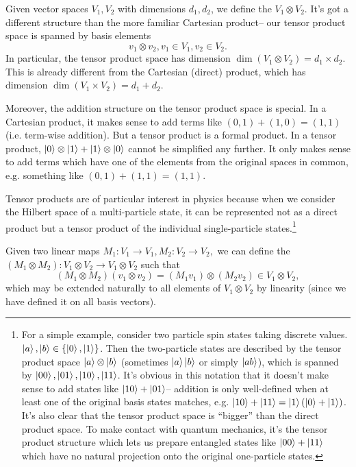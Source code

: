 \begin{defn}
Given vector spaces $V_1,V_2$ with dimensions $d_1,d_2$, we define the  $V_1 \otimes V_2$. It's got a different structure than the more familiar Cartesian product-- our tensor product space is spanned by basis elements
$$v_1 \otimes v_2, v_1\in V_1,v_2\in V_2.$$
In particular, the tensor product space has dimension $\dim(V_1\otimes V_2)=d_1 \times d_2$.
This is already different from the Cartesian (direct) product, which has dimension $\dim(V_1\times V_2)=d_1+d_2$. 

Moreover, the addition structure on the tensor product space is special. In a Cartesian product, it makes sense to add terms like $(0,1)+(1,0)=(1,1)$ (i.e. term-wise addition). But a tensor product is a formal product. In a tensor product, $\left| 0 \right>\otimes \left| 1 \right> + \left| 1 \right>\otimes \left| 0 \right>$ cannot be simplified any further. It only makes sense to add terms which have one of the elements from the original spaces in common, e.g. something like $(0,1)+(1,1)=(1,1).$ 

Tensor products are of particular interest in physics because when we consider the Hilbert space of a multi-particle state, it can be represented not as a direct product but a tensor product of the individual single-particle states.\footnote{For a simple example, consider two particle spin states taking discrete values. $\left| a \right>,\left| b \right>\in \{\left| 0 \right>,\left| 1 \right>\}$. Then the two-particle states are described by the tensor product space $\left| a \right>\otimes\left| b \right>$ (sometimes $\left| a \right>\left| b \right>$ or simply $\left| ab \right>$), which is spanned by $\left| 00 \right>,\left| 01 \right>,\left| 10 \right>,\left| 11 \right>$. It's obvious in this notation that it doesn't make sense to add states like $\left| 10 \right>+\left| 01 \right>$-- addition is only well-defined when at least one of the original basis states matches, e.g. $\left| 10 \right>+\left| 11 \right>=\left| 1 \right>(\left| 0 \right>+\left| 1 \right>)$. It's also clear that the tensor product space is ``bigger'' than the direct product space. To make contact with quantum mechanics, it's the tensor product structure which lets us prepare entangled states like $\left| 00 \right>+\left| 11 \right>$ which have no natural projection onto the original one-particle states.}

Given two linear maps $M_1:V_1\to V_1,M_2: V_2\to V_2,$ we can define the  $(M_1\otimes M_2): V_1\otimes V_2 \to V_1 \otimes V_2$ such that
$$(M_1\otimes M_2)(v_1\otimes v_2)=(M_1 v_1)\otimes (M_2 v_2) \in V_1\otimes V_2,$$
which may be extended naturally to all elements of $V_1\otimes V_2$ by linearity (since we have defined it on all basis vectors).
\end{defn}
